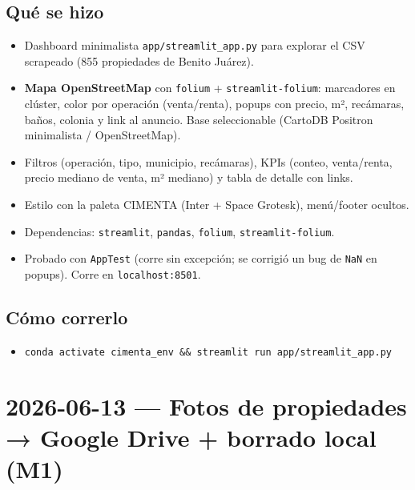 \documentclass[11pt]{article}
\newcommand{\codigo}[1]{\texttt{#1}}
\begin{document}
\subsection*{Qué se hizo}
\begin{itemize}
  \item Dashboard minimalista \codigo{app/streamlit\_app.py} para explorar el CSV
        scrapeado (855 propiedades de Benito Juárez).
  \item \textbf{Mapa OpenStreetMap} con \codigo{folium} + \codigo{streamlit-folium}:
        marcadores en clúster, color por operación (venta/renta), popups con
        precio, m², recámaras, baños, colonia y link al anuncio. Base
        seleccionable (CartoDB Positron minimalista / OpenStreetMap).
  \item Filtros (operación, tipo, municipio, recámaras), KPIs (conteo, venta/renta,
        precio mediano de venta, m² mediano) y tabla de detalle con links.
  \item Estilo con la paleta CIMENTA (Inter + Space Grotesk), menú/footer ocultos.
  \item Dependencias: \codigo{streamlit}, \codigo{pandas}, \codigo{folium},
        \codigo{streamlit-folium}.
  \item Probado con \codigo{AppTest} (corre sin excepción; se corrigió un bug de
        \codigo{NaN} en popups). Corre en \codigo{localhost:8501}.
\end{itemize}

\subsection*{Cómo correrlo}
\begin{itemize}
  \item \codigo{conda activate cimenta\_env \&\& streamlit run app/streamlit\_app.py}
\end{itemize}

\section*{2026-06-13 — Fotos de propiedades → Google Drive + borrado local (M1)}
\end{document}

